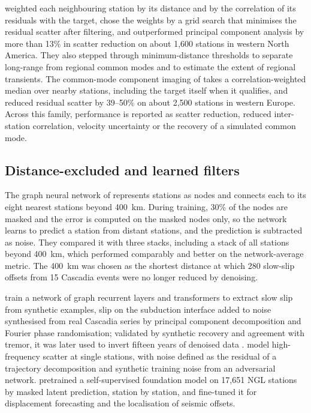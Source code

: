 \documentclass[preprint,12pt,authoryear]{elsarticle}
\begin{document}
\citet{tianshen2016} weighted each neighbouring station by its distance and by the correlation of its residuals with the target, chose the weights by a grid search that minimises the residual scatter after filtering, and outperformed principal component analysis by more than 13\% in scatter reduction on about 1,600 stations in western North America. They also stepped through minimum-distance thresholds to separate long-range from regional common modes and to estimate the extent of regional transients. The common-mode component imaging of \citet{kreemer2021} takes a correlation-weighted median over nearby stations, including the target itself when it qualifies, and reduced residual scatter by 39--50\% on about 2,500 stations in western Europe. Across this family, performance is reported as scatter reduction, reduced inter-station correlation, velocity uncertainty or the recovery of a simulated common mode.

\subsection{Distance-excluded and learned filters}

The graph neural network of \citet{bachelot2025} represents stations as nodes and connects each to its eight nearest stations beyond 400~km. During training, 30\% of the nodes are masked and the error is computed on the masked nodes only, so the network learns to predict a station from distant stations, and the prediction is subtracted as noise. They compared it with three stacks, including a stack of all stations beyond 400~km, which performed comparably and better on the network-average metric. The 400~km was chosen as the shortest distance at which 280 slow-slip offsets from 15 Cascadia events were no longer reduced by denoising.

\citet{costantino2024} train a network of graph recurrent layers and transformers to extract slow slip from synthetic examples, slip on the subduction interface added to noise synthesised from real Cascadia series by principal component decomposition and Fourier phase randomisation; validated by synthetic recovery and agreement with tremor, it was later used to invert fifteen years of denoised data \citep{costantino2026}. \citet{mastella2025} model high-frequency scatter at single stations, with noise defined as the residual of a trajectory decomposition \citep{bedfordbevis2018} and synthetic training noise from an adversarial network. \citet{teutschmann2026} pretrained a self-supervised foundation model on 17,651 NGL stations by masked latent prediction, station by station, and fine-tuned it for displacement forecasting and the localisation of seismic offsets.
\end{document}
